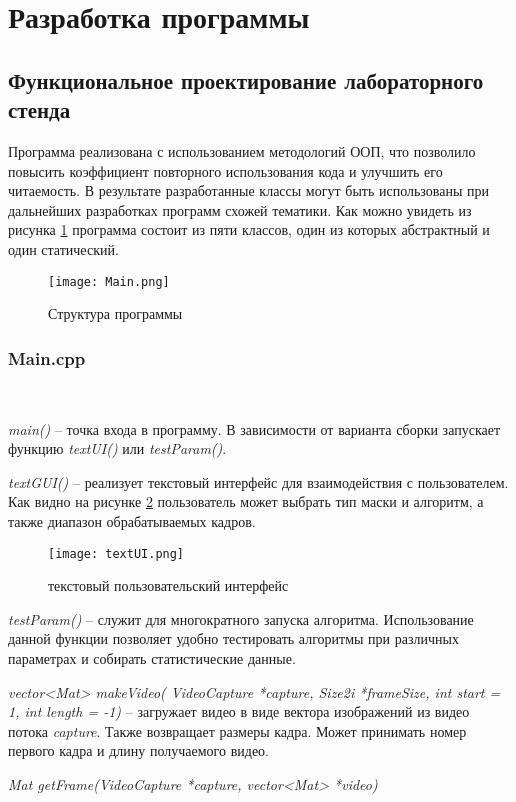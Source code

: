 \section{Разработка программы}
\subsection{Функциональное проектирование лабораторного стенда}
Программа реализована с использованием методологий ООП, что позволило повысить коэффициент повторного использования кода и улучшить его читаемость. В результате разработанные классы могут быть использованы при дальнейших разработках программ схожей тематики. Как можно увидеть из рисунка \ref{fig:uml} программа состоит из пяти классов, один из которых абстрактный и один статический. 
\begin{figure}[h]
    \centering   
    \texttt{[image: Main.png]} 
    \caption{Структура программы}
    \label{fig:uml}
\end{figure} 


\subsubsection{Main.cpp}~


\textit{main()} -- точка входа в программу. В зависимости от варианта сборки запускает функцию \textit{textUI()} или \textit{testParam()}.

\textit{textGUI()} -- реализует текстовый интерфейс для взаимодействия с пользователем. Как видно на рисунке \ref{fig:textUI} пользователь может выбрать тип маски и алгоритм, а также диапазон обрабатываемых кадров.
\begin{figure}[h]
    \centering   
    \texttt{[image: textUI.png]} 
    \caption{текстовый пользовательский интерфейс}
    \label{fig:textUI}
\end{figure} 

\textit{testParam()} -- служит для многократного запуска алгоритма. Использование данной функции позволяет удобно тестировать алгоритмы при различных параметрах и собирать статистические данные. 

\textit{vector<Mat> makeVideo( VideoCapture *capture, Size2i *frameSize, int start = 1, int length = -1)} -- загружает видео в виде вектора изображений из видео потока \textit{capture}. Также возвращает размеры кадра. Может принимать номер первого кадра и длину получаемого видео. 

\textit{Mat getFrame(VideoCapture *capture, vector<Mat> *video)}

